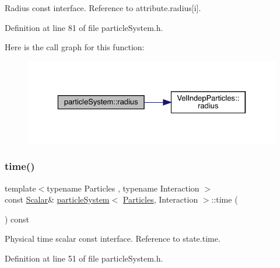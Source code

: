 Radius const interface. Reference to attribute.\+radius\mbox{[}i\mbox{]}. 



Definition at line 81 of file particle\+System.\+h.

Here is the call graph for this function\+:\nopagebreak
\begin{figure}[H]
\begin{center}
\leavevmode
\includegraphics[width=329pt]{classparticle_system_a1986f65f13b773a51b19eba1ccd6c46a_cgraph}
\end{center}
\end{figure}
\mbox{\label{classparticle_system_a25bf169b4acd1ede1dd03a218d5f105c}} 
\subsubsection{\texorpdfstring{time()}{time()}}
{\footnotesize\ttfamily template$<$typename Particles , typename Interaction $>$ \\
const \mbox{\hyperlink{classparticle_system_a3938954186247e3eab01cc75fcc62b40}{Scalar}}\& \mbox{\hyperlink{classparticle_system}{particle\+System}}$<$ \mbox{\hyperlink{struct_particles}{Particles}}, Interaction $>$\+::time (\begin{DoxyParamCaption}{ }\end{DoxyParamCaption}) const\hspace{0.3cm}{\ttfamily [inline]}}



Physical time scalar const interface. Reference to state.\+time. 



Definition at line 51 of file particle\+System.\+h.

